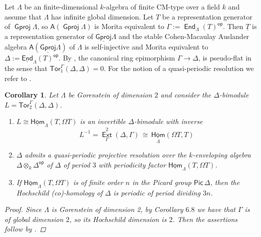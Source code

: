 \documentclass[oneside, a4paper,reqno]{amsart}
\numberwithin{equation}{section}
\newtheorem{cor}[thm]{Corollary}
\theoremstyle{definition}
\begin{document}
Let $\Lambda$ be an finite-dimensional $k$-algebra of finite CM-type
over a field $k$ and assume that $\Lambda$ has infinite global
dimension. Let $T$ be a representation generator of ${\operatorname{\mathsf{Gproj}}\nolimits}\Lambda$,
so $\mathsf{A}({\operatorname{\mathsf{Gproj}}\nolimits}\Lambda)$ is Morita equivalent to $\Gamma :=
\operatorname*{\mathsf{End}}_{\Lambda}(T)^\operatorname*{\mathsf{op}}$. Then $\underline{T}$ is a representation
generator of ${\operatorname{\underline{\mathsf{Gproj}}}\nolimits}\Lambda$ and the stable Cohen-Macaulay
Auslander algebra $\mathsf{A}({\operatorname{\underline{\mathsf{Gproj}}}\nolimits}\Lambda)$ of $\Lambda$ is
self-injective and  Morita equivalent to $\Delta :=
\operatorname*{\underline{\mathsf{End}}}_{\Lambda}(T)^\operatorname*{\mathsf{op}}$. By \cite{Buchweitz}, the canonical ring
epimorphism $\Gamma {\longrightarrow} \Delta$, is pseudo-flat in the sense that
$\mathsf{Tor}^{\Gamma}_{1}(\Delta,\Delta) = 0$.
 For the notion of a quasi-periodic resolution we
refer to \cite{Buchweitz}.

\begin{cor} Let $\Lambda$ be Gorenstein of dimension $2$ and consider the $\Delta$-bimodule $L =
\mathsf{Tor}^{\Gamma}_{2}(\Delta,\Delta)$.
\begin{enumerate}
\item $L \cong
\operatorname*{\underline{\mathsf{Hom}}}_{\Lambda}(T,\Omega T)$ is an invertible $\Delta$-bimodule with
inverse 
\[
L^{-1} = \operatorname*{\mathsf{Ext}}^{2}_{\Gamma}(\Delta,\Gamma) \, \cong \,
\operatorname*{\underline{\mathsf{Hom}}}_{\Lambda}(\Omega T,T)
\]
\item $\Delta$ admits a quasi-periodic projective resolution over
the $k$-enveloping algebra $\Delta\otimes_{k}\Delta^\operatorname*{\mathsf{op}}$ of $\Delta$ of
period $3$ with periodicity factor $\operatorname*{\underline{\mathsf{Hom}}}_{\Lambda}(T,\Omega T)$.
\item If  $\operatorname*{\underline{\mathsf{Hom}}}_{\Lambda}(T,\Omega T)$ is of finite order $n$ in the Picard group $\mathsf{Pic}\,\Delta$,
then the Hochschild (co)-homology of $\Delta$ is periodic of period
dividing $3n$.
\end{enumerate}
\begin{proof} Since $\Lambda$ is Gorenstein of dimension 2, by
Corollary $6.8$ we have that $\Gamma$ is of global dimension $2$, so
its Hochschild dimension is $2$. Then the assertions follow by
\cite[Theorem 1.5]{Buchweitz}.
\end{proof}
\end{cor}
\end{document}
